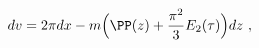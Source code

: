 \begin{equation}
  \label{eq:dv}
  dv = 2 \pi dx - m
\Big(\PP(z) +\frac{\pi^2}3 E_2(\tau) \Big) dz\ ,
\end{equation}

